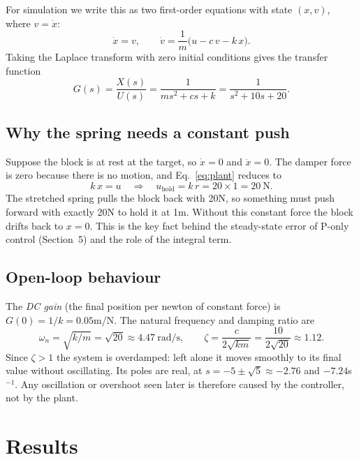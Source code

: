 \documentclass[]{article}
\begin{document}
For simulation we write this as two first-order equations with state $(x, v)$, where $v=\dot{x}$:
\begin{equation}
	\dot{x} = v, \qquad
	\dot{v} = \frac{1}{m}\bigl(u - c\,v - k\,x\bigr).
\end{equation}
Taking the Laplace transform with zero initial conditions gives the transfer function
\begin{equation}
	G(s) = \frac{X(s)}{U(s)} = \frac{1}{m s^2 + c s + k} = \frac{1}{s^2 + 10 s + 20}.
\end{equation}

\subsection{Why the spring needs a constant push}
Suppose the block is at rest at the target, so $\dot{x}=0$ and $\ddot{x}=0$. The damper force is zero because there is no motion, and Eq.~\eqref{eq:plant} reduces to
\begin{equation}
	k\,x = u \quad\Longrightarrow\quad u_{\text{hold}} = k\, r = 20 \times 1 = 20\ \text{N}.
\end{equation}
The stretched spring pulls the block back with 20N, so something must push forward with exactly 20N to hold it at 1m. Without this constant force the block drifts back to $x=0$. This is the key fact behind the steady-state error of P-only control (Section~5) and the role of the integral term.

\subsection{Open-loop behaviour}
The \emph{DC gain} (the final position per newton of constant force) is $G(0) = 1/k = 0.05$m/N. The natural frequency and damping ratio are
\begin{equation}
	\omega_n = \sqrt{k/m} = \sqrt{20} \approx 4.47\ \text{rad/s}, \qquad
	\zeta = \frac{c}{2\sqrt{km}} = \frac{10}{2\sqrt{20}} \approx 1.12 .
\end{equation}
Since $\zeta > 1$ the system is overdamped: left alone it moves smoothly to its final value without oscillating. Its poles are real, at $s = -5 \pm \sqrt{5} \approx -2.76$ and $-7.24$s$^{-1}$. Any oscillation or overshoot seen later is therefore caused by the controller, not by the plant.


\section{Results}
\end{document}
